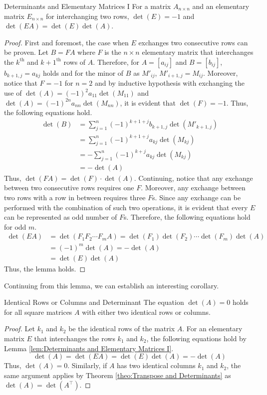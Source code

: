 \documentclass[../../../main.tex]{subfiles}
\begin{document}
\begin{lemma}{}{Determinants and Elementary Matrices I}
For a matrix $A_{n \times n}$ and an elementary matrix
$E_{n \times n}$ for interchanging two rows, $\det(E) = -1$
and $\det(EA) = \det(E) \det(A)$.
\end{lemma}
\begin{proof}
First and foremost, the case when $E$ exchanges two consecutive
rows can be proven. Let $B = FA$ where $F$ is the $n \times n$
elementary matrix that interchanges the $k^\text{th}$ and
$k+1^\text{th}$ rows of $A$. Therefore, for $A = [a_{ij}]$ and
$B = [b_{ij}]$, $b_{k+1,j} = a_{kj}$ holds and for the minor of $B$ as
$M'_{ij}$, $M'_{i+1,j} = M_{ij}$. Moreover, notice that $F = -1$ for
$n = 2$ and by inductive hypothesis with exchanging the use of
$\det(A) = (-1)^2 a_{11} \det(M_{11})$ and $\det(A) = (-1)^{2n} a_{nn}
\det(M_{nn})$, it is evident that $\det(F) = -1$. Thus, the following
equations hold.
\begin{align*}
    \det(B)
    &= \sum_{j=1}^n (-1)^{k+1+j} b_{k+1,j} \det(M'_{k+1,j}) \\
    &= \sum_{j=1}^n (-1)^{k+1+j} a_{kj} \det(M_{kj}) \\
    &= -\sum_{j=1}^n (-1)^{k+j} a_{kj} \det(M_{kj}) \\
    &= -\det(A)
\end{align*}
Thus, $\det(FA) = \det(F) \cdot \det(A)$. Continuing, notice that
any exchange between two consecutive rows requires one $F$. Moreover,
any exchange between two rows with a row in between requires three
$F$s. Since any exchange can be performed with the combination of
such two operations, it is evident that every $E$ can be represented
as odd number of $F$s. Therefore, the following equations hold for
odd $m$.
\begin{align*}
    \det(EA)
    &= \det(F_1 F_2 \cdots F_m A)
    = \det(F_1) \det(F_2) \cdots \det(F_m) \det(A) \\
    &= (-1)^m \det(A)
    = -\det(A) \\
    &= \det(E) \det(A)
\end{align*}
Thus, the lemma holds.
\end{proof}

Continuing from this lemma, we can establish an interesting corollary.

\begin{corollary}{}{Identical Rows or Columns and Determinant}
The equation $\det(A) = 0$ holds for all square matrices $A$ with
either two identical rows or columns.
\end{corollary}
\begin{proof}
Let $k_1$ and $k_2$ be the identical rows of the matrix $A$.
For an elementary matrix $E$ that interchanges the rows $k_1$ and
$k_2$, the following equations hold by Lemma \ref{lem:Determinants
and Elementary Matrices I}.
\[
\det(A)
= \det(EA)
= \det(E) \det(A)
= -\det(A)
\]
Thus, $\det(A) = 0$. Similarly, if $A$ has two identical columns
$k_1$ and $k_2$, the same argument applies by Theorem
\ref{theo:Transpose and Determinants} as $\det(A) =
\det(A^\intercal)$.
\end{proof}
\end{document}

